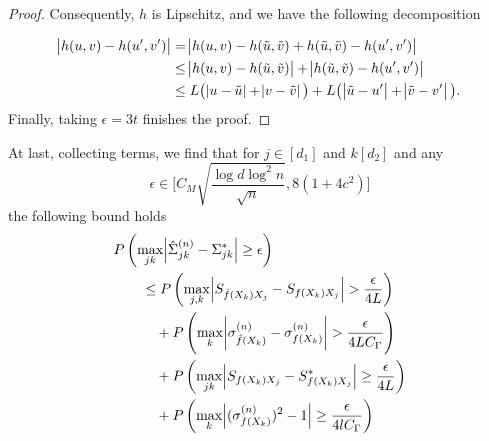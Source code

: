 \begin{proof}
    Consequently, $h$ is Lipschitz, and we have the following decomposition

    \begin{align*}
        \abs{h(u,v) - h(u',v')} & = \abs{h(u,v) - h(\tilde{u},\tilde{v}) + h(\tilde{u},\tilde{v}) - h(u',v')}                                     \\
                                & \leq \abs{h(u,v) - h(\tilde{u},\tilde{v})} + \abs{h(\tilde{u},\tilde{v}) - h(u',v')}                            \\
                                & \leq L \big(\abs{u-\tilde{u}} + \abs{v-\tilde{v}}\big) + L \big(\abs{\tilde{u} - u'} + \abs{\tilde{v}-v'}\big).
    \end{align*}
    Finally, taking $\epsilon = 3t$ finishes the proof.
\end{proof}

At last, collecting terms, we find that for $j \in [d_1]$ and $k [d_2]$ and any \[\epsilon \in \Big[C_M\sqrt{\frac{\log d \log^2 n}{\sqrt{n}}},8(1+4c^2)\Big]\] the following bound holds
\begin{align*}
    \MoveEqLeft P\left(\max_{jk}\abs{\hat{\Sigma}_{jk}^{(n)} -  \Sigma_{jk}^{*}} \geq \epsilon \right)                       \\
     & \leq P\left(\max_{j,k} \abs{S_{\hat{f}(X_k)X_j} - S_{f(X_k)X_j}} > \frac{\epsilon}{4L} \right)                        \\
     & \quad + P\left(\max_k \abs{\sigma^{(n)}_{\hat{f}(X_k)} - \sigma^{(n)}_{f(X_k)}} > \frac{\epsilon}{4LC_\Gamma} \right) \\
     & \quad + P\left(\max_{jk}\abs{S_{{f}(X_k)X_j} - S^*_{{f}(X_k)X_j}} \geq \frac{\epsilon}{4L} \right)                    \\
     & \quad +  P\left(\max_k \abs{(\sigma^{(n)}_{{f}(X_k)})^2 - 1} \geq \frac{\epsilon}{4lC_\Gamma} \right)
\end{align*}



